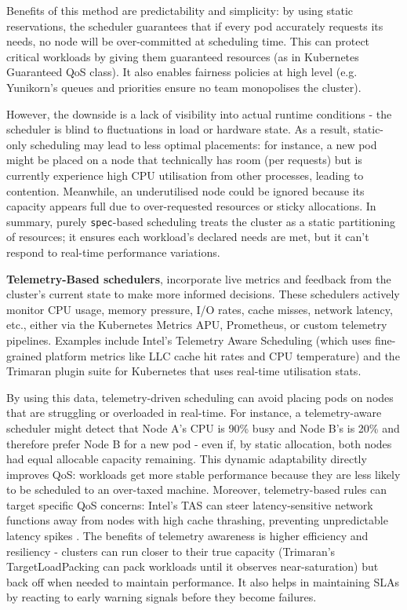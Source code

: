 Benefits of this method are predictability and
simplicity: by using static reservations, the scheduler guarantees that if every
pod accurately requests its needs, no node will be over-committed at scheduling
time. This can protect critical workloads by giving them guaranteed resources
(as in Kubernetes Guaranteed QoS class). It also enables fairness policies at
high level (e.g. Yunikorn's queues and priorities ensure no team monopolises the
cluster).

However, the downside is a lack of visibility into actual runtime conditions -
the scheduler is blind to fluctuations in load or hardware state. As a result,
static-only scheduling may lead to less optimal placements: for instance, a new
pod might be placed on a node that technically has room (per requests) but is
currently experience high CPU utilisation from other processes, leading to
contention. Meanwhile, an underutilised node could be ignored because its
capacity appears full due to over-requested resources or sticky allocations. In
summary, purely \verb|spec|-based scheduling treats the cluster as a static
partitioning of resources; it ensures each workload's declared needs are met, but
it can't respond to real-time performance variations.

\textbf{Telemetry-Based schedulers}, incorporate live metrics and feedback from
the cluster's current state to make more informed decisions. These schedulers
actively monitor CPU usage, memory pressure, I/O rates, cache misses, network
latency, etc., either via the Kubernetes Metrics APU, Prometheus, or custom
telemetry pipelines. Examples include Intel's Telemetry Aware Scheduling \cite{}
(which uses fine-grained platform metrics like LLC cache hit rates and CPU
temperature) and the Trimaran plugin suite for Kubernetes \cite{} that uses
real-time utilisation stats.

By using this data, telemetry-driven scheduling can avoid placing pods on nodes
that are struggling or overloaded in real-time. For instance, a telemetry-aware
scheduler might detect that Node A's CPU is 90\% busy and Node B's is 20\% and
therefore prefer Node B for a new pod - even if, by static allocation, both
nodes had equal allocable capacity remaining. This dynamic adaptability
directly improves QoS: workloads get more stable performance because they are
less likely to be scheduled to an over-taxed machine. Moreover, telemetry-based
rules can target specific QoS concerns: Intel's TAS can steer latency-sensitive
network functions away from nodes with high cache thrashing, preventing
unpredictable latency spikes \cite{}. The benefits of telemetry awareness is
higher efficiency and resiliency - clusters can run closer to their true capacity
(Trimaran's TargetLoadPacking can pack workloads until it observes
near-saturation) but back off when needed to maintain performance. It also helps
in maintaining SLAs by reacting to early warning signals before they become
failures.

